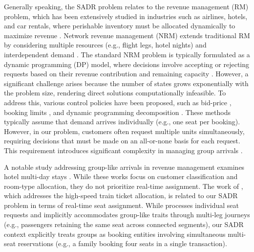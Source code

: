 Generally speaking, the SADR problem relates to the revenue management (RM) problem, which has been extensively studied in industries such as airlines, hotels, and car rentals, where perishable inventory must be allocated dynamically to maximize revenue \citep{van2005introduction}. Network revenue management (NRM) extends traditional RM by considering multiple resources (e.g., flight legs, hotel nights) and interdependent demand \citep{williamson1992airline}. The standard NRM problem is typically formulated as a dynamic programming (DP) model, where decisions involve accepting or rejecting requests based on their revenue contribution and remaining capacity \citep{talluri1998analysis}. However, a significant challenge arises because the number of states grows exponentially with the problem size, rendering direct solutions computationally infeasible. To address this, various control policies have been proposed, such as bid-price \citep{adelman2007dynamic, bertsimas2003revenue}, booking limits \citep{gallego1997multiproduct}, and dynamic programming decomposition \citep{talluri2006theory, liu2008choice}. These methods typically assume that demand arrives individually (e.g., one seat per booking). However, in our problem, customers often request multiple units simultaneously, requiring decisions that must be made on an all-or-none basis for each request. This requirement introduces significant complexity in managing group arrivals \citep{talluri2006theory}.


A notable study addressing group-like arrivals in revenue management examines hotel multi-day stays \citep{bitran1995application, goldman2002models, aydin2018decomposition}. While these works focus on customer classification and room-type allocation, they do not prioritize real-time assignment. The work of \cite{zhu2023assign}, which addresses the high-speed train ticket allocation, is related to our SADR problem in terms of real-time seat assignment. While \cite{zhu2023assign} processes individual seat requests and implicitly accommodates group-like traits through multi-leg journeys (e.g., passengers retaining the same seat across connected segments), our SADR context explicitly treats groups as booking entities involving simultaneous multi-seat reservations (e.g., a family booking four seats in a single transaction). 




